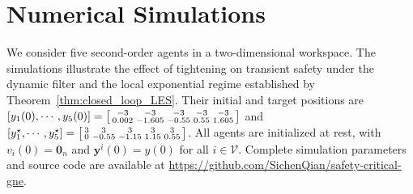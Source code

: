 \section{Numerical Simulations}\label{simulations}
We consider five second-order agents in a two-dimensional workspace.
The simulations illustrate the effect of tightening on transient
safety under the dynamic filter and the local exponential regime
established by Theorem~\ref{thm:closed_loop_LES}.
Their initial and target positions are
$[y_1(0),\cdots,y_5(0)] = \begin{bsmallmatrix} -3 & -3 & -3 & -3 & -3 \\ 0.002 & -1.605 & -0.55 & 0.55 & 1.605 \end{bsmallmatrix}$ and $[y_1^\star,\cdots,y_5^\star] = \begin{bsmallmatrix} 3 & 3 & 3 & 3 & 3 \\ 0 & -0.55 & -1.15 & 1.15 & 0.55 \end{bsmallmatrix}$.
All agents are initialized at rest, with
$
v_i(0)=\mathbf0_n
$
and
$
\mathbf y^i(0)=y(0)
$
for all $i\in\mathcal V$.
Complete simulation parameters and source code are available at
\url{https://github.com/SichenQian/safety-critical-gne}.

